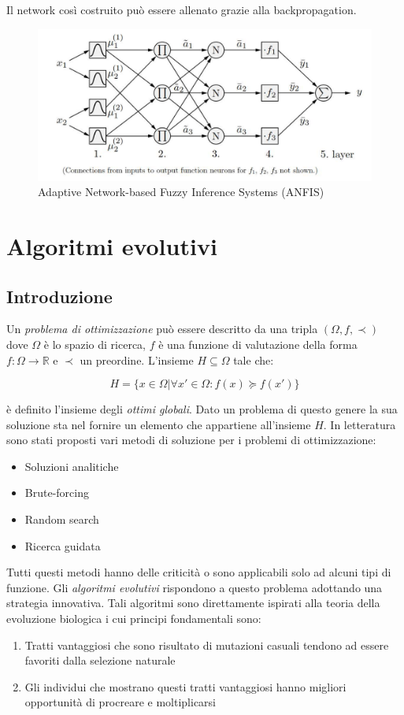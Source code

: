 \documentclass[10pt,a4paper]{article}
\begin{document}
Il network così costruito può essere allenato grazie alla backpropagation.

\begin{figure}
\centering
\includegraphics[scale=0.3]{img/fuzzyneural.png}
\caption{Adaptive Network-based Fuzzy Inference
Systems (ANFIS)}
\label{fig:35}
\end{figure}

\section{Algoritmi evolutivi}

\subsection{Introduzione}

Un \emph{problema di ottimizzazione} può essere descritto da una tripla $(\Omega,f,\prec)$ dove $\Omega$ è lo spazio di ricerca, $f$ è una funzione di valutazione della forma $f:\Omega \to \mathbb{R}$ e $\prec$ un preordine. L'insieme $H \subseteq \Omega$ tale che:

$$
H = \{ x \in \Omega | \forall x' \in \Omega: f(x) \succeq f(x') \}
$$

è definito l'insieme degli \emph{ottimi globali}. Dato un problema di questo genere la sua soluzione sta nel fornire un elemento che appartiene all'insieme $H$. In letteratura sono stati proposti vari metodi di soluzione per i problemi di ottimizzazione:
\begin{itemize}
\item{Soluzioni analitiche}
\item{Brute-forcing}
\item{Random search}
\item{Ricerca guidata}
\end{itemize}
Tutti questi metodi hanno delle criticità o sono applicabili solo ad alcuni tipi di funzione. Gli \emph{algoritmi evolutivi} rispondono a questo problema adottando una strategia innovativa. Tali algoritmi sono direttamente ispirati alla teoria della evoluzione biologica i cui principi fondamentali sono:
\begin{enumerate}
\item{Tratti vantaggiosi che sono risultato di mutazioni casuali tendono ad essere favoriti dalla selezione naturale}
\item{Gli individui che mostrano questi tratti vantaggiosi hanno migliori opportunità di procreare e moltiplicarsi}
\end{enumerate}
\end{document}
